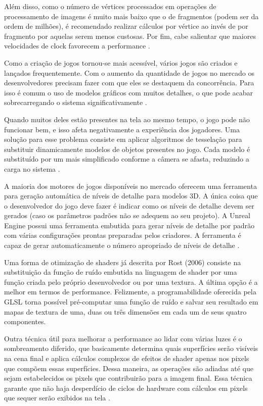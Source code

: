 Além disso, como o número de vértices processados em operações de processamento de imagens é muito mais baixo que o de fragmentos (podem ser da ordem de milhões), é recomendado realizar cálculos por vértice ao invés de por fragmento por aquelas serem menos custosas. Por fim, cabe salientar que maiores velocidades de clock favorecem a performance \cite{optimizationMobile}.

Como a criação de jogos tornou-se mais acessível, vários jogos são criados e lançados frequentemente. Com o aumento da quantidade de jogos no mercado os desenvolvedores precisam fazer com que eles se destaquem da concorrência. Para isso é comum o uso de modelos gráficos com muitos detalhes, o que pode acabar sobrecarregando o sistema significativamente \cite{performanceTesselation}. 

Quando muitos deles estão presentes na tela ao mesmo tempo, o jogo pode não funcionar bem, e isso afeta negativamente a experiência dos jogadores. Uma solução para esse problema consiste em aplicar algoritmos de tesselação para substituir dinamicamente modelos de objetos presentes no jogo. Cada modelo é substituído por um mais simplificado conforme a câmera se afasta, reduzindo a carga no sistema \cite{performanceTesselation}.

A maioria dos motores de jogos disponíveis no mercado oferecem uma ferramenta para geração automática de níveis de detalhe para modelos 3D. A única coisa que o desenvolvedor do jogo deve fazer é indicar como os níveis de detalhe devem ser gerados (caso os parâmetros padrões não se adequem ao seu projeto). A Unreal Engine possui uma ferramenta embutida para gerar níveis de detalhe por padrão com várias configurações prontas preparadas pelos criadores. A ferramenta é capaz de gerar automaticamente o número apropriado de níveis de detalhe \cite{performanceTesselation}.

Uma forma de otimização de shaders já descrita por Rost (2006) consiste na substituição da função de ruído embutida na linguagem de shader por uma função criada pelo próprio desenvolvedor ou por uma textura. A última opção é a melhor em termos de performance. Felizmente, a programabilidade oferecida pela GLSL torna possível pré-computar uma função de ruído e salvar seu resultado em mapas de textura de uma, duas ou três dimensões em cada um de seus quatro componentes.

Outra técnica útil para melhorar a performance ao lidar com várias luzes é o sombreamento diferido, que basicamente determina quais superfícies serão visíveis na cena final e aplica cálculos complexos de efeitos de shader apenas nos pixels que compõem essas superfícies. Dessa maneira, as operações são adiadas até que sejam estabelecidos os pixels que contribuirão para a imagem final. Essa técnica garante que não haja desperdício de ciclos de hardware com cálculos em pixels que sequer serão exibidos na tela \cite{GLSLBook}.

